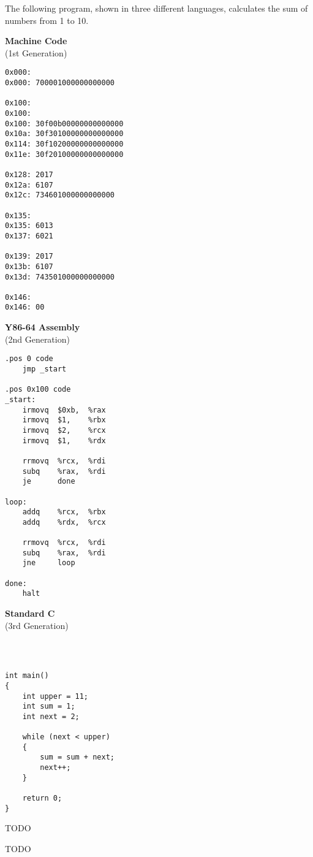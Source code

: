 
The following program, shown in three different languages, calculates the sum of numbers from 1 to 10.

\begin{center}
\begin{minipage}[t]{168pt}

\textbf{Machine Code} \\
(1st Generation)

\begin{verbatim}
0x000:
0x000: 700001000000000000

0x100:
0x100:
0x100: 30f00b00000000000000
0x10a: 30f30100000000000000
0x114: 30f10200000000000000
0x11e: 30f20100000000000000

0x128: 2017
0x12a: 6107
0x12c: 734601000000000000

0x135:
0x135: 6013
0x137: 6021

0x139: 2017
0x13b: 6107
0x13d: 743501000000000000

0x146:
0x146: 00
\end{verbatim}
\end{minipage}
\hfill
\begin{minipage}[t]{144pt}

\textbf{Y86-64 Assembly} \\
(2nd Generation)

\begin{verbatim}
.pos 0 code
    jmp _start

.pos 0x100 code
_start:
    irmovq  $0xb,  %rax
    irmovq  $1,    %rbx
    irmovq  $2,    %rcx
    irmovq  $1,    %rdx

    rrmovq  %rcx,  %rdi
    subq    %rax,  %rdi
    je      done

loop:
    addq    %rcx,  %rbx
    addq    %rdx,  %rcx

    rrmovq  %rcx,  %rdi
    subq    %rax,  %rdi
    jne     loop

done:
    halt
\end{verbatim}
\end{minipage}
\hfill
\begin{minipage}[t]{162pt}

\textbf{Standard C} \\
(3rd Generation)

\begin{verbatim}



int main()
{
    int upper = 11;
    int sum = 1;
    int next = 2;

    while (next < upper)
    {
        sum = sum + next;
        next++;
    }

    return 0;
}
\end{verbatim}
\end{minipage}
\end{center}




\Q TODO

\begin{answer}
TODO
\end{answer}
